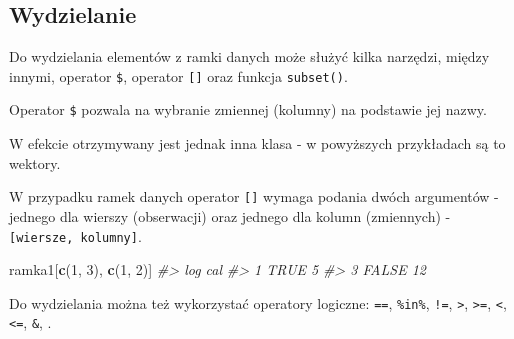 \documentclass[paper=6in:9in,pagesize=pdftex,headinclude=on,footinclude=on,10pt]{scrbook}
\newenvironment{Shaded}{\begin{snugshade}}{\end{snugshade}}
\newcommand{\CommentTok}[1]{\textcolor[rgb]{0.56,0.35,0.01}{\textit{#1}}}
\newcommand{\DecValTok}[1]{\textcolor[rgb]{0.00,0.00,0.81}{#1}}
\newcommand{\KeywordTok}[1]{\textcolor[rgb]{0.13,0.29,0.53}{\textbf{#1}}}
\newcommand{\NormalTok}[1]{#1}
\newcommand{\OperatorTok}[1]{\textcolor[rgb]{0.81,0.36,0.00}{\textbf{#1}}}
\newcommand{\StringTok}[1]{\textcolor[rgb]{0.31,0.60,0.02}{#1}}
\begin{document}
\hypertarget{wydzielanie-df}{%
\subsection{Wydzielanie}\label{wydzielanie-df}}

Do wydzielania elementów z ramki danych może służyć kilka narzędzi, między innymi, operator \texttt{\$}, operator \texttt{{[}{]}} oraz funkcja \texttt{subset()}.

Operator \texttt{\$} pozwala na wybranie zmiennej (kolumny) na podstawie jej nazwy.

\begin{Shaded}
\end{Shaded}

W efekcie otrzymywany jest jednak inna klasa - w powyższych przykładach są to wektory.

W przypadku ramek danych operator \texttt{{[}{]}} wymaga podania dwóch argumentów - jednego dla wierszy (obserwacji) oraz jednego dla kolumn (zmiennych) - \texttt{{[}wiersze,\ kolumny{]}}.

\begin{Shaded}
\begin{Highlighting}[]
\NormalTok{ramka1[}\KeywordTok{c}\NormalTok{(}\DecValTok{1}\NormalTok{, }\DecValTok{3}\NormalTok{), }\KeywordTok{c}\NormalTok{(}\DecValTok{1}\NormalTok{, }\DecValTok{2}\NormalTok{)]}
\CommentTok{#>     log cal}
\CommentTok{#> 1  TRUE   5}
\CommentTok{#> 3 FALSE  12}
\end{Highlighting}
\end{Shaded}

Do wydzielania można też wykorzystać operatory logiczne: \texttt{==}, \texttt{\%in\%}, \texttt{!=}, \texttt{\textgreater{}}, \texttt{\textgreater{}=}, \texttt{\textless{}}, \texttt{\textless{}=}, \texttt{\&}, \texttt{\textbar{}}.

\begin{Shaded}
\end{Shaded}
\end{document}
